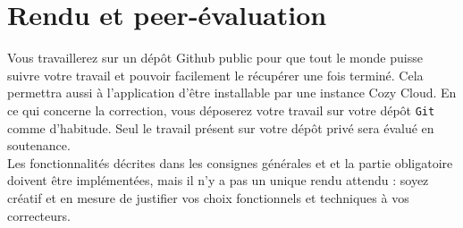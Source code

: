\documentclass{42-fr}
\begin{document}



\chapter{Rendu et peer-\'evaluation}

	Vous travaillerez sur un d\'ep\^ot Github public pour que tout le monde puisse suivre
	votre travail et pouvoir facilement le r\'ecup\'erer une fois termin\'e. Cela permettra
	aussi \`a l'application d'\^etre installable par une instance Cozy Cloud.\newline
	En ce qui concerne la correction, vous d\'eposerez votre travail sur votre d\'ep\^ot
	\texttt{Git} comme d'habitude.\newline
	Seul le travail pr\'esent sur votre d\'ep\^ot priv\'e sera \'evalu\'e en soutenance.\\
	Les fonctionnalit\'es d\'ecrites dans les consignes g\'en\'erales et et la partie
	obligatoire doivent \^etre impl\'ement\'ees, mais il n'y a pas un unique rendu attendu :
	soyez cr\'eatif et en mesure de justifier vos choix fonctionnels et techniques \`a vos
	correcteurs.



\end{document}
